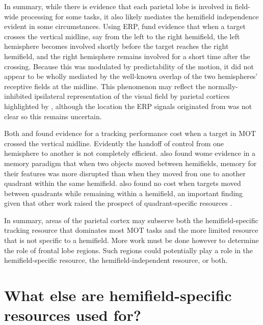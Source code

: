\documentclass[
]{book}
\begin{document}
In summary, while there is evidence that each parietal lobe is involved in field-wide processing for some tasks, it also likely mediates the hemifield independence evident in some circumstances. Using ERP, \citet{drewSoftHandoffAttention2014} fund evidence that when a target crosses the vertical midline, say from the left to the right hemifield, the left hemisphere becomes involved shortly before the target reaches the right hemifield, and the right hemisphere remains involved for a short time after the crossing. Because this was modulated by predictability of the motion, it did not appear to be wholly mediated by the well-known overlap of the two hemispheres' receptive fields at the midline. This phenomenon may reflect the normally-inhibited ipsilateral representation of the visual field by parietal cortices highlighted by \citet{battelliRoleParietalLobe2009}, although the location the ERP signals originated from was not clear so this remains uncertain.

Both \citet{strongHemifieldspecificControlSpatial2020} and \citet{minamiHemifieldCrossingsMultiple2019} found evidence for a tracking performance cost when a target in MOT crossed the vertical midline. Evidently the handoff of control from one hemisphere to another is not completely efficient. \citet{saikiRobustColorshapeBinding2019} also found wome evidence in a memory paradigm that when two objects moved between hemifields, memory for their features was more disrupted than when they moved fron one to another quadrant within the same hemifield. \citet{strongHemifieldspecificControlSpatial2020} also found no cost when targets moved between quadrants while remaining within a hemifield, an important finding given that other work raised the prospect of quadrant-specific resources \citep{carlsonQuadranticDeficitReveals2007}.

In summary, areas of the parietal cortex may subserve both the hemifield-specific tracking resource that dominates most MOT tasks and the more limited resource that is not specific to a hemifield. More work must be done however to determine the role of frontal lobe regions. Such regions could potentially play a role in the hemifield-specific resource, the hemifield-independent resource, or both.

\hypertarget{what-else-are-hemifield-specific-resources-used-for}{%
\section{What else are hemifield-specific resources used for?}\label{what-else-are-hemifield-specific-resources-used-for}}
\end{document}
